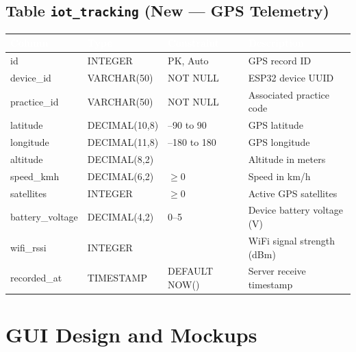 \documentclass[12pt,a4paper,twoside]{report}
\begin{document}
\section{Table \texttt{iot\_tracking} \textnormal{\small(New — GPS Telemetry)}}
\begin{center}
\begin{tabularx}{\textwidth}{|l|l|l|X|}
\hline
\rowcolor{tableHdr}
\textcolor{white}{\textbf{Column}} & \textcolor{white}{\textbf{Type}} &
\textcolor{white}{\textbf{Constraint}} & \textcolor{white}{\textbf{Description}} \\
\hline
\rowcolor{rowOdd}id & INTEGER & PK, Auto & GPS record ID \\
\hline\rowcolor{rowEven}device\_id & VARCHAR(50) & NOT NULL & ESP32 device UUID \\
\hline\rowcolor{rowOdd}practice\_id & VARCHAR(50) & NOT NULL & Associated practice code \\
\hline\rowcolor{rowEven}latitude & DECIMAL(10,8) & --90 to 90 & GPS latitude \\
\hline\rowcolor{rowOdd}longitude & DECIMAL(11,8) & --180 to 180 & GPS longitude \\
\hline\rowcolor{rowEven}altitude & DECIMAL(8,2) & & Altitude in meters \\
\hline\rowcolor{rowOdd}speed\_kmh & DECIMAL(6,2) & $\geq 0$ & Speed in km/h \\
\hline\rowcolor{rowEven}satellites & INTEGER & $\geq 0$ & Active GPS satellites \\
\hline\rowcolor{rowOdd}battery\_voltage & DECIMAL(4,2) & 0--5 & Device battery voltage (V) \\
\hline\rowcolor{rowEven}wifi\_rssi & INTEGER & & WiFi signal strength (dBm) \\
\hline\rowcolor{rowOdd}recorded\_at & TIMESTAMP & DEFAULT NOW() & Server receive timestamp \\
\hline
\end{tabularx}
\end{center}

\chapter{GUI Design and Mockups}
\end{document}
